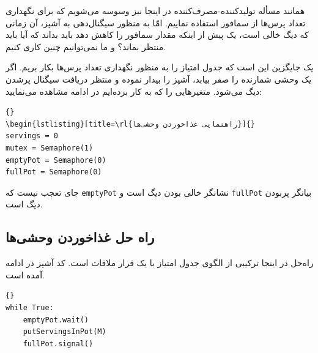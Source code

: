 \documentclass{book}
\newcommand{\clearemptydoublepage}{\newpage\cleardoublepage}
\begin{document}
    همانند مسأله تولیدکننده-مصرف‌کننده  در اینجا نیز وسوسه می‌شویم که برای نگهداری تعداد پرس‌ها از سمافور استفاده نماییم. 
    امّا به منظور سیگنال‌دهی به آشپز،‌ آن زمانی که دیگ خالی است، یک پیش از اینکه مقدار سمافور را کاهش دهد باید بداند که آیا باید منتظر بماند؟ و 
    ما نمی‌توانیم چنین کاری کنیم. 

    یک جایگزین این است که جدول امتیاز را به منظور نگهداری تعداد پرس‌ها بکار بریم. 
    اگر یک وحشی شمارنده را صفر بیابد، آشپز را بیدار نموده و منتظر دریافت سیگنال پرشدن دیگ می‌شود. 
    متغیرهایی را که به کار برده‌ایم در ادامه مشاهده می‌نمایید:

\begin{latin}
\begin{lstlisting}[title={Dining Savages hint}]{}
\begin{lstlisting}[title=\rl{راهنمایی غذاخوردن وحشی‌ها}]{}
servings = 0
mutex = Semaphore(1)
emptyPot = Semaphore(0)
fullPot = Semaphore(0)
\end{lstlisting}
\end{latin}

    جای تعجب نیست که {\tt emptyPot} نشانگر خالی بودن دیگ است و {\tt fullPot} بیانگر پربودن دیگ است. 

\clearemptydoublepage
\subsection{راه‌ حل غذاخوردن وحشی‌ها}

    راه‌حل در اینجا ترکیبی از الگوی جدول امتیاز با یک قرار ملاقات است.  کد آشپز در ادامه آمده است. 

\begin{latin}
\begin{lstlisting}[title=\rl{راه‌ حل غذاخوردن وحشی‌ها (آشپز)}]{}
while True:
    emptyPot.wait()
    putServingsInPot(M)
    fullPot.signal()
\end{lstlisting}
\end{latin}
\end{document}

